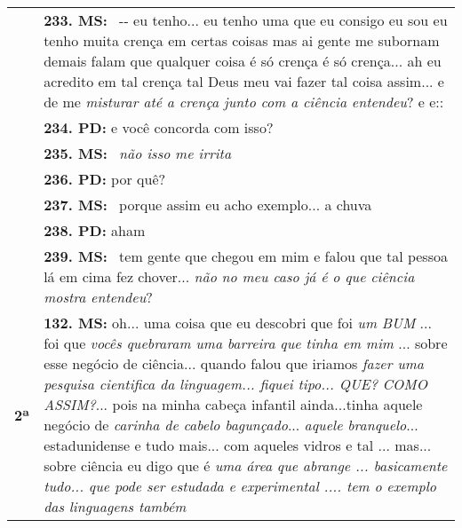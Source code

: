 \begin{table}[h]
\begin{threeparttable}
\begin{tabular}{@{} 
				>{\raggedright\arraybackslash}p{} 
				>{\raggedright\arraybackslash}p{} @{}}
			& \textbf{233. MS:} ~-\/- eu tenho... eu tenho uma que eu consigo eu sou eu tenho muita crença em certas coisas mas ai gente me subornam demais falam que qualquer coisa é só crença é só crença... ah eu acredito em tal crença tal Deus meu vai fazer tal coisa assim... e de me \emph{misturar até a crença junto com a ciência entendeu}? e e:: \\
			
			& \textbf{234. PD: }e você concorda com isso? \\
			
			& \textbf{235. MS:} ~\emph{não isso me irrita} \\
			
			& \textbf{236. PD: }por quê? \\
			
			& \textbf{237. MS:} ~porque assim eu acho exemplo... a chuva \\
			
			& \textbf{238. PD: }aham \\
			
			& \textbf{239. MS:} ~tem gente que chegou em mim e falou que tal pessoa lá em cima fez chover... \emph{não no meu caso já é o que ciência mostra entendeu}? \\
            \midrule
			
			\textbf{2ª} & \textbf{132. MS:} oh... uma coisa que eu descobri que foi \emph{um BUM} ... foi que \emph{vocês quebraram uma barreira que tinha em mim} ... sobre esse negócio de ciência... quando falou que iriamos \emph{fazer uma pesquisa cientifica da linguagem... fiquei tipo... QUE? COMO ASSIM?}... pois na minha cabeça infantil ainda...tinha aquele negócio de \emph{carinha de cabelo bagunçado}... \emph{aquele branquelo}... estadunidense e tudo mais... com aqueles vidros e tal ... mas... sobre ciência eu digo que é \emph{uma área que abrange ... basicamente tudo... que pode ser estudada e experimental .... tem o exemplo das linguagens também} \\
			\bottomrule
		\end{tabular}
	\end{threeparttable}
\end{table}
